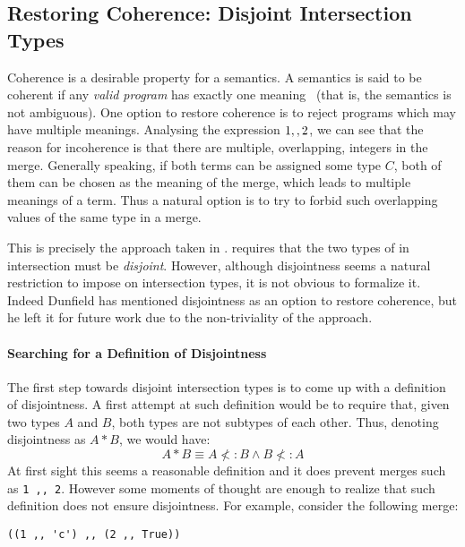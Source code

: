 \subsection{Restoring Coherence: Disjoint Intersection Types}
Coherence is a desirable property for a semantics. A semantics is said
to be coherent if any \emph{valid program} has exactly one
meaning~\cite{Reynolds:1991} (that is, the semantics is not ambiguous).
One option to restore coherence is to reject programs which may have
multiple meanings.
Analysing the expression $1 ,, 2$, we can see that the reason
for incoherence is that there are multiple, overlapping, integers in the
merge. Generally speaking, if both terms can be assigned some type $C$,
both of them can be chosen as the meaning of the merge,
which leads to multiple meanings of a term.
Thus a natural option is to try to forbid such overlapping
values of the same type in a merge.

This is precisely the approach taken in \name. \name requires that the
two types of in intersection must be \emph{disjoint}.  However,
although disjointness seems a natural restriction to impose on
intersection types, it is not obvious to formalize it. Indeed Dunfield
has mentioned disjointness as an option to restore coherence, but he
left it for future work due to the non-triviality of the approach.

\paragraph{Searching for a Definition of Disjointness}
The first step towards disjoint intersection types is to come up
with a definition of disjointness. A first attempt at such definition would
be to require that, given two types $A$ and $B$, both types are not
subtypes of each other. Thus, denoting disjointness as $A * B$, we would have:
\[A * B \equiv A \not<: B \wedge B \not<: A\]
At first sight this seems a reasonable definition and it does prevent
merges such as \lstinline{1 ,, 2}. However some moments of thought are enough to realize that
such definition does not ensure disjointness. For example, consider
the following merge:

\begin{lstlisting}
((1 ,, 'c') ,, (2 ,, True))
\end{lstlisting}

